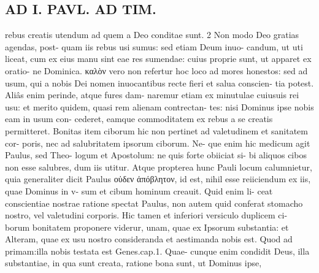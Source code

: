 \documentclass{article}
\begin{document}
\begin{pages}
\section*{AD I. PAVL. AD TIM. }
\marginpar{[ p.196 ]}rebus creatis utendum ad quem a Deo conditae sunt. 2 Non modo Deo gratias agendas, post- quam iis rebus usi sumus: sed etiam Deum inuo- candum, ut uti liceat, cum ex eius manu sint eae res sumendae: cuius proprie sunt, ut apparet ex oratio- ne Dominica. καλὸν vero non refertur hoc loco ad mores honestos: sed ad usum, qui a nobis Dei nomen inuocantibus recte fieri et salua conscien- tia potest. Aliâs enim perinde, atque fures dam- naremur etiam ex minutulae cuiusuis rei usu: et merito quidem, quasi rem alienam contrectan- tes: nisi Dominus ipse nobis eam in usum con- cederet, eamque commoditatem ex rebus a se creatis permitteret. Bonitas item ciborum hic non pertinet ad valetudinem et sanitatem cor- poris, nec ad salubritatem ipsorum ciborum. Ne- que enim hic medicum agit Paulus, sed Theo- logum et Apostolum: ne quis forte obiiciat si- bi aliquos cibos non esse salubres, dum iis utitur. Atque propterea hunc Pauli locum calumnietur, quia generaliter dicit Paulus οὐδεν ἀπόβλητον, id est, nihil esse reiiciendum ex iis, quae Dominus in v- sum et cibum hominum creauit. Quid enim li- ceat conscientiae nostrae ratione spectat Paulus, non autem quid conferat stomacho nostro, vel valetudini corporis. Hic tamen et inferiori versiculo duplicem ci- borum bonitatem proponere viderur, unam, quae ex Ipsorum substantia: et Alteram, quae ex usu nostro consideranda et aestimanda nobis est. Quod ad primam:illa nobis testata est Genes.cap.1. Quae- cunque enim condidit Deus, illa substantiae, in qua sunt creata, ratione bona sunt, ut Dominus ipse, 

\end{pages}
\end{document}
